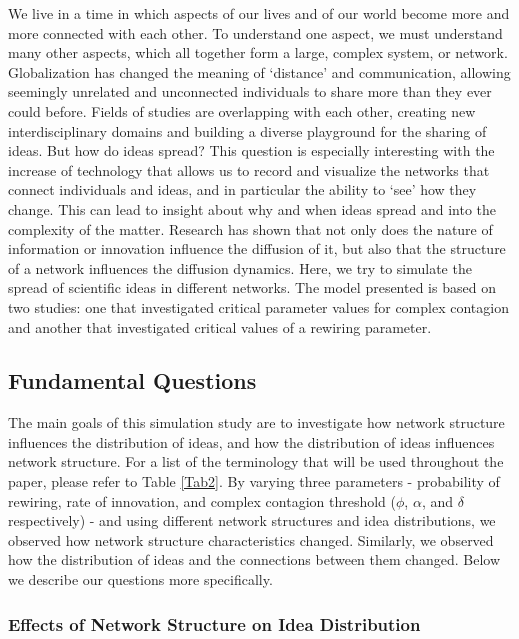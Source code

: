
We live in a time in which aspects of our lives and of our world become more and more connected with each other. To understand one aspect, we must understand many other aspects, which all together form a large, complex system, or network. Globalization has changed the meaning of `distance' and communication, allowing seemingly unrelated and unconnected individuals to share more than they ever could before. Fields of studies are overlapping with each other, creating new interdisciplinary domains and building a diverse playground for the sharing of ideas. But how do ideas spread? This question is especially interesting with the increase of technology that allows us to record and visualize the networks that connect individuals and ideas, and in particular the ability to `see' how they change. This can lead to insight about why and when ideas spread and into the complexity of the matter. Research has shown that not only does the nature of information or innovation influence the diffusion of it, but also that the structure of a network influences the diffusion dynamics. Here, we try to simulate the spread of scientific ideas in different networks. The model presented is based on two studies: one that investigated critical parameter values for complex contagion %
and another that investigated critical values of a rewiring parameter.%

\subsection{Fundamental Questions}

The main goals of this simulation study are to investigate how network structure influences the distribution of ideas, and how the distribution of ideas influences network structure. For a list of the terminology that will be used throughout the paper, please refer to Table \ref{Tab2}. By varying three parameters - probability of rewiring, rate of innovation, and complex contagion threshold ($\phi$, $\alpha$, and $\delta$ respectively) - and using different network structures and idea distributions, we observed how network structure characteristics changed. Similarly, we observed how the distribution of ideas and the connections between them changed. Below we describe our questions more specifically.


\newpage


\subsubsection{Effects of Network Structure on Idea Distribution}

